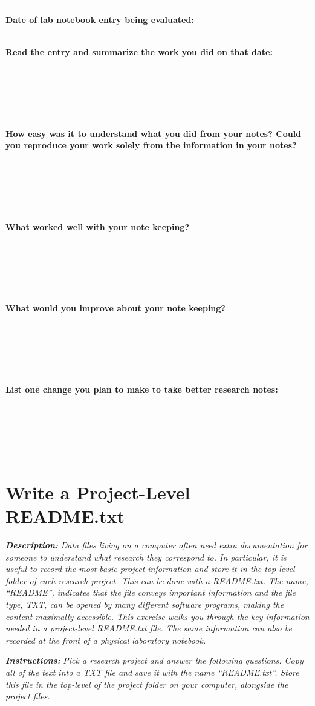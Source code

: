 \documentclass[
]{book}
\begin{document}
\begin{center}\rule{0.5\linewidth}{0.5pt}\end{center}

\textbf{Date of lab notebook entry being evaluated:} \_\_\_\_\_\_\_\_\_\_\_\_\_\_\_\_\_\_\_\_

\textbf{Read the entry and summarize the work you did on that date:}

~

~

~

\textbf{How easy was it to understand what you did from your notes? Could you reproduce your work solely from the information in your notes?}

~

~

~

\textbf{What worked well with your note keeping?}

~

~

~

\textbf{What would you improve about your note keeping?}

~

~

~

\textbf{List one change you plan to make to take better research notes:}

~

~

~

\hypertarget{readme-txt}{%
\section{Write a Project-Level README.txt}\label{readme-txt}}

\textbf{\emph{Description:}} \emph{Data files living on a computer often need extra documentation for someone to understand what research they correspond to. In particular, it is useful to record the most basic project information and store it in the top-level folder of each research project. This can be done with a README.txt. The name, ``README'', indicates that the file conveys important information and the file type, TXT, can be opened by many different software programs, making the content maximally accessible. This exercise walks you through the key information needed in a project-level README.txt file. The same information can also be recorded at the front of a physical laboratory notebook.}

\textbf{\emph{Instructions:}} \emph{Pick a research project and answer the following questions. Copy all of the text into a TXT file and save it with the name ``README.txt''. Store this file in the top-level of the project folder on your computer, alongside the project files.}
\end{document}
